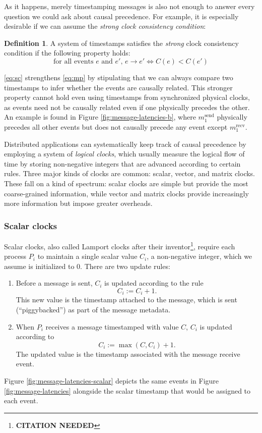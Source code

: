 \documentclass[]             %
{NASA}                       %
\theoremstyle{definition}
\newtheorem{definition}{Definition}[section]
\newcommand{\citationneeded}{\footnote{\textbf{CITATION NEEDED}}}
\begin{document}
As it happens, merely timestamping messages is also not enough to
answer every question we could ask about causal precedence. For
example, it is especially desirable if we can assume the \emph{strong
  clock consistency condition}:
\begin{definition}
  A system of timestamps satisfies the \emph{strong} clock consistency
  condition if the following property holds:
  \[ \textrm{for all events $e$ and $e'$, } e \to e' \iff C(e) < C(e') \label{eq:sc}\tag{SC} \]
\end{definition}
\ref{eq:sc} strengthens \ref{eq:mp} by stipulating that we can always
compare two timestamps to infer whether the events are causally
related. This stronger property cannot hold even using timestamps from
synchronized physical clocks, as events need not be causally related
even if one physically precedes the other. An example is found in
Figure \ref{fig:message-latencies-b}, where $m_1^\textrm{send}$
physically precedes all other events but does not causally precede any
event except $m_1^\textrm{recv}$.

Distributed applications can systematically keep track of causal
precedence by employing a system of \emph{logical clocks}, which
usually measure the logical flow of time by storing non-negative
integers that are advanced according to certain rules. Three major
kinds of clocks are common: scalar, vector, and matrix clocks. These
fall on a kind of spectrum: scalar clocks are simple but provide the
most coarse-grained information, while vector and matrix clocks
provide increasingly more information but impose greater overheads.


\subsubsection{Scalar clocks}
Scalar clocks, also called Lamport clocks after their
inventor\citationneeded, require each process $P_i$ to maintain a
single scalar value $C_i$, a non-negative integer, which we assume is
initialized to $0$. There are two update rules:
\begin{enumerate}
\item Before a message is sent, $C_i$ is updated according to the rule
  \[C_i := C_i + 1.\]
  This new value is the timestamp attached to the message, which is
  sent (``piggybacked'') as part of the message metadata.
\item When $P_i$ receives a message timestamped with value $C$, $C_i$
  is updated according to
  \[C_i := \max(C, C_i) + 1.\]
  The updated value is the timestamp associated with the message
  receive event.
\end{enumerate}
Figure \ref{fig:message-latencies-scalar} depicts the same events in
Figure \ref{fig:message-latencies} alongside the scalar timestamp that
would be assigned to each event.
\end{document}
